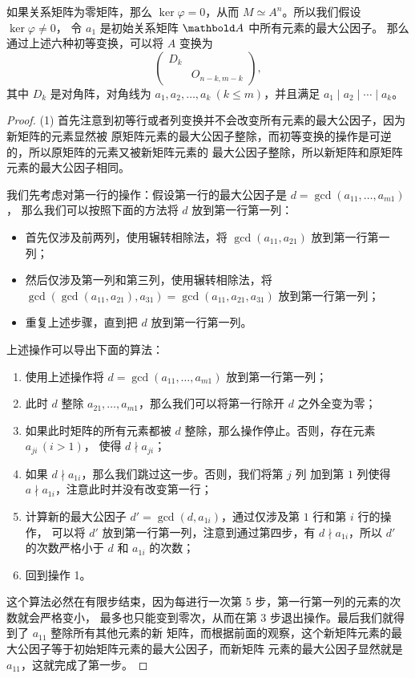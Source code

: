 \begin{theorem}
  如果关系矩阵为零矩阵，那么 $\ker\varphi=0$，从而
  $M\simeq A^n$。所以我们假设 $\ker\varphi\neq 0$，
  令 $a_1$ 是初始关系矩阵 $\mat A$ 中所有元素的最大公因子。
  那么通过上述六种初等变换，可以将 $A$ 变换为
  \[
    \begin{pmatrix}
      D_k & \\
      & O_{n-k,m-k}
    \end{pmatrix}  ,
  \]
  其中 $D_k$ 是对角阵，对角线为 $a_1,a_2,\dots,a_k\ (k\leq m)$，并且满足
  $a_1\mid a_2\mid\cdots\mid a_k$。
\end{theorem}
\begin{proof}
  (1) 首先注意到初等行或者列变换并不会改变所有元素的最大公因子，因为新矩阵的元素显然被
  原矩阵元素的最大公因子整除，而初等变换的操作是可逆的，所以原矩阵的元素又被新矩阵元素的
  最大公因子整除，所以新矩阵和原矩阵元素的最大公因子相同。

  我们先考虑对第一行的操作：假设第一行的最大公因子是 $d=\gcd(a_{11},\dots,a_{m1})$，
  那么我们可以按照下面的方法将 $d$ 放到第一行第一列：
  \begin{itemize}[nosep]
    \item 首先仅涉及前两列，使用辗转相除法，将 $\gcd(a_{11},a_{21})$ 放到第一行第一列；
    \item 然后仅涉及第一列和第三列，使用辗转相除法，将 $\gcd(\gcd(a_{11},a_{21}),a_{31})
    =\gcd(a_{11},a_{21},a_{31})$ 放到第一行第一列；
    \item 重复上述步骤，直到把 $d$ 放到第一行第一列。
  \end{itemize}
  上述操作可以导出下面的算法：
  \begin{enumerate}[nosep]
    \item 使用上述操作将 $d=\gcd(a_{11},\dots,a_{m1})$ 放到第一行第一列；
    \item 此时 $d$ 整除 $a_{21},\dots,a_{m1}$，那么我们可以将第一行除开 $d$ 之外全变为零；
    \item 如果此时矩阵的所有元素都被 $d$ 整除，那么操作停止。否则，存在元素 $a_{ji}\,(i>1)$，
    使得 $d\nmid a_{ji}$；
    \item 如果 $d\nmid a_{1i}$，那么我们跳过这一步。否则，我们将第 $j$ 列
    加到第 $1$ 列使得 $a\nmid a_{1i}$，注意此时并没有改变第一行；
    \item 计算新的最大公因子 $d'=\gcd(d,a_{1i})$，通过仅涉及第 $1$ 行和第 $i$ 行的操作，
    可以将 $d'$ 放到第一行第一列，注意到通过第四步，有 $d\nmid a_{1i}$，所以
    $d'$ 的次数严格小于 $d$ 和 $a_{1i}$ 的次数；
    \item 回到操作 1。
  \end{enumerate}
  这个算法必然在有限步结束，因为每进行一次第 5 步，第一行第一列的元素的次数就会严格变小，
  最多也只能变到零次，从而在第 3 步退出操作。最后我们就得到了 $a_{11}$ 整除所有其他元素的新
  矩阵，而根据前面的观察，这个新矩阵元素的最大公因子等于初始矩阵元素的最大公因子，而新矩阵
  元素的最大公因子显然就是 $a_{11}$，这就完成了第一步。


\end{proof}
